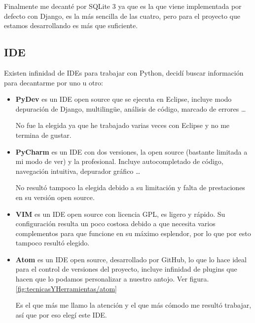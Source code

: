 Finalmente me decanté por SQLite 3 ya que es la que viene implementada por defecto con Django, es la más sencilla de las cuatro, pero para el proyecto que estamos desarrollando es más que suficiente.

\subsection{IDE}

Existen infinidad de IDEs para trabajar con Python, decidí buscar información para decantarme por uno u otro:

	\begin{itemize}
	\item \textbf{PyDev} \cite{PyDev} es un IDE open source que se ejecuta en Eclipse, incluye modo depuración de Django, multilingüe, análisis de código, marcado de errores \ldots
	
	No fue la elegida ya que he trabajado varias veces con Eclipse y no me termina de gustar.
	
	\item \textbf{PyCharm} \cite{PyCharm}  es un IDE con dos versiones, la open source (bastante limitada a mi modo de ver) y la profesional. 
	Incluye autocompletado de código, navegación intuitiva, depurador gráfico \ldots
	
	No resultó tampoco la elegida debido a su limitación y falta de prestaciones en su versión open source.
	
	\item \textbf{VIM} \cite{VIM} es un IDE open source con licencia GPL, es ligero y rápido. Su configuración resulta un poco costosa debido a que necesita varios complementos para que funcione en su máximo esplendor, por lo que por esto tampoco resultó elegido. 

	\item \textbf{Atom} \cite{Atom} es un IDE open source, desarrollado por GitHub, lo que lo hace ideal para el control de versiones del proyecto, incluye infinidad de plugins que hacen que lo podamos personalizar a nuestro antojo. Ver figura. \ref{fig:tecnicasYHerramientas/atom}
	
	Es el que más me llamo la atención y el que más cómodo me resultó trabajar, así que por eso elegí este IDE.
	
	\end{itemize}


